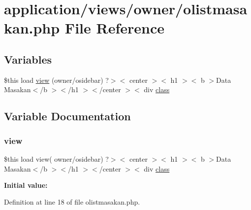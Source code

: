 \hypertarget{olistmasakan_8php}{}\section{application/views/owner/olistmasakan.php File Reference}
\label{olistmasakan_8php}
\subsection*{Variables}
\begin{DoxyCompactItemize}
\item 
\$this load \mbox{\hyperlink{olistmasakan_8php_a7026a5a2047e4fa11144c149b1faca93}{view}} (\textquotesingle{}owner/osidebar\textquotesingle{}) ?$>$$<$ center $>$$<$ h1 $>$$<$ b $>$Data Masakan$<$/b $>$$<$/h1 $>$$<$/center $>$$<$ div \mbox{\hyperlink{waiter_2olaporan_8php_a185c73c6507391d1eb38c776b68ce96d}{class}}
\end{DoxyCompactItemize}


\subsection{Variable Documentation}
\mbox{\label{olistmasakan_8php_a7026a5a2047e4fa11144c149b1faca93}} 
\subsubsection{\texorpdfstring{view}{view}}
{\footnotesize\ttfamily \$this load view( \textquotesingle{}owner/osidebar\textquotesingle{}) ?$>$$<$ center $>$$<$ h1 $>$$<$ b $>$Data Masakan$<$/b $>$$<$/h1 $>$$<$/center $>$$<$ div \mbox{\hyperlink{waiter_2olaporan_8php_a185c73c6507391d1eb38c776b68ce96d}{class}}}

{\bfseries Initial value\+:}
\begin{DoxyCode}{0}
\DoxyCodeLine{=\textcolor{stringliteral}{"kotak jarakatas"}>}

\end{DoxyCode}


Definition at line 18 of file olistmasakan.\+php.

